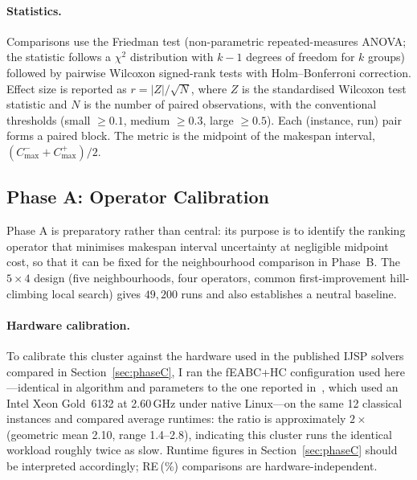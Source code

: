 \documentclass[preprint,12pt]{elsarticle}
\begin{document}
\paragraph{Statistics.} Comparisons use the Friedman test (non-parametric repeated-measures ANOVA; the statistic follows a $\chi^2$ distribution with $k-1$ degrees of freedom for $k$ groups) followed by pairwise Wilcoxon signed-rank tests with Holm--Bonferroni correction. Effect size is reported as $r = |Z| / \sqrt{N}$, where $Z$ is the standardised Wilcoxon test statistic and $N$ is the number of paired observations, with the conventional thresholds (small $\geq 0.1$, medium $\geq 0.3$, large $\geq 0.5$). Each (instance, run) pair forms a paired block. The metric is the midpoint of the makespan interval, $(C^-_{\max} + C^+_{\max})/2$.

\subsection{Phase A: Operator Calibration}
\label{sec:phaseA}

Phase A is preparatory rather than central: its purpose is to identify the ranking operator that minimises makespan interval uncertainty at negligible midpoint cost, so that it can be fixed for the neighbourhood comparison in Phase~B. The $5 \times 4$ design (five neighbourhoods, four operators, common first-improvement hill-climbing local search) gives $49{,}200$ runs and also establishes a neutral baseline.

\paragraph{Hardware calibration.} To calibrate this cluster against the hardware used in the published IJSP solvers compared in Section~\ref{sec:phaseC}, I ran the fEABC+HC configuration used here---identical in algorithm and parameters to the one reported in~\cite{DiazFEABC2023}, which used an Intel Xeon Gold~6132 at 2.60\,GHz under native Linux---on the same 12 classical instances and compared average runtimes: the ratio is approximately $2\times$ (geometric mean 2.10, range 1.4--2.8), indicating this cluster runs the identical workload roughly twice as slow. Runtime figures in Section~\ref{sec:phaseC} should be interpreted accordingly; RE\,(\%) comparisons are hardware-independent.
\end{document}
